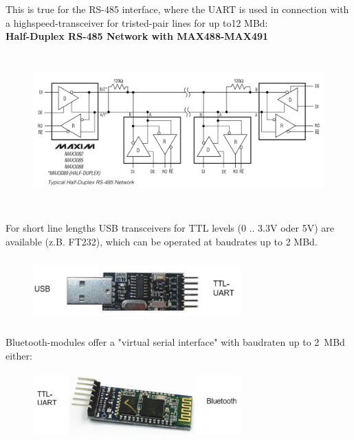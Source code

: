 This is true for the RS-485 interface, where the UART is used in connection with a highspeed-transceiver for tristed-pair lines for up to12 MBd:\\

{\rot\bf Half-Duplex RS-485 Network with MAX488-MAX491}\\

    \begin{figure}[h]
    \centering
    \includegraphics[width=15cm, height=6cm]{Images/image48.png}
    \label{fig:Fig }
    \end{figure}
    
For short line lengths USB transceivers for TTL levels (0 .. 3.3V oder 5V) are available (z.B. FT232), which can be operated at baudrates up to 2 MBd.

    \begin{figure}[h]
    \centering
    \includegraphics[width=8cm, height=2.5cm]{Images/image49.png}
    \label{fig:Fig }
    \end{figure}
\newpage
Bluetooth-modules offer a "virtual serial interface" with baudraten up to 2~MBd either:

    \begin{figure}[h]
    \centering
    \includegraphics[width=8cm, height=2.5cm]{Images/image50.png}
    \label{fig:Fig }
    \end{figure}

